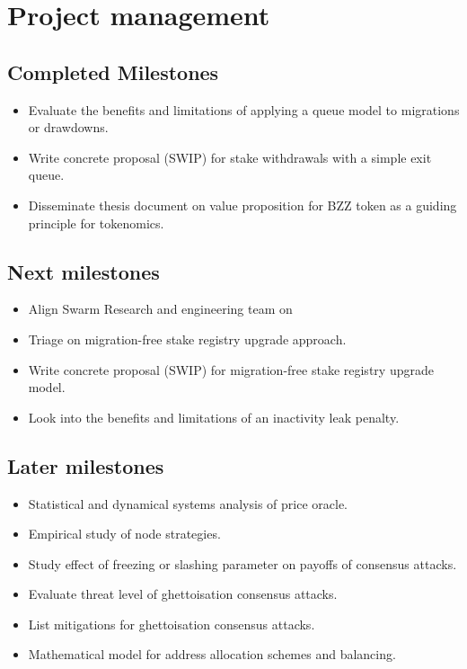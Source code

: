 \newpage
\section*{Project management}

\subsection*{Completed Milestones}

\begin{itemize}
  \item Evaluate the benefits and limitations of applying a queue model to migrations or drawdowns.
  \item Write concrete proposal (SWIP) for stake withdrawals with a simple exit queue.
  \item Disseminate thesis document on value proposition for BZZ token as a guiding principle for tokenomics.    
\end{itemize}

\subsection*{Next milestones}

\begin{itemize}
  \item Align Swarm Research and engineering team on 
  \item Triage on migration-free stake registry upgrade approach. 
  \item Write concrete proposal (SWIP) for migration-free stake registry upgrade model.
  \item Look into the benefits and limitations of an inactivity leak penalty.
\end{itemize}

\subsection*{Later milestones}
\begin{itemize}
  \item Statistical and dynamical systems analysis of price oracle.
  \item Empirical study of node strategies.
  \item Study effect of freezing or slashing parameter on payoffs of consensus attacks.
  \item Evaluate threat level of ghettoisation consensus attacks.
  \item List mitigations for ghettoisation consensus attacks.
  \item Mathematical model for address allocation schemes and balancing.
\end{itemize}


